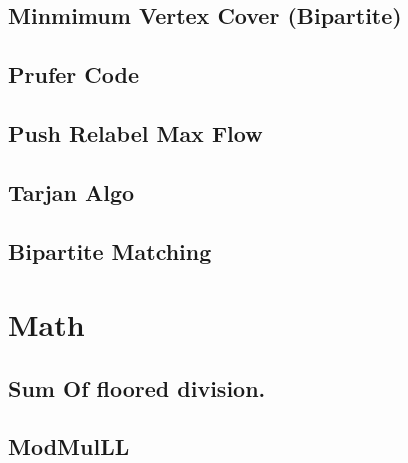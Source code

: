\subsection{Minmimum Vertex Cover (Bipartite)}
\vspace{-2ex}
\raggedbottom
\vspace{-3.2ex}
\hrulefill
\subsection{Prufer Code}
\vspace{-2ex}
\raggedbottom
\vspace{-3.2ex}
\hrulefill
\subsection{Push Relabel Max Flow}
\vspace{-2ex}
\raggedbottom
\vspace{-3.2ex}
\hrulefill
\subsection{Tarjan Algo}
\vspace{-2ex}
\raggedbottom
\vspace{-3.2ex}
\hrulefill
\subsection{Bipartite Matching}
\vspace{-2ex}
\raggedbottom
\vspace{-3.2ex}
\hrulefill

\section{Math}
\subsection{Sum Of floored division.}
\vspace{-2ex}
\raggedbottom
\vspace{-3.2ex}
\hrulefill
\subsection{ModMulLL}
\vspace{-2ex}
\raggedbottom
\vspace{-3.2ex}
\hrulefill
